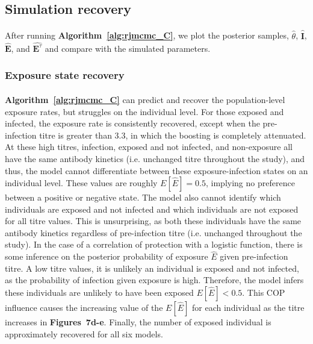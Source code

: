 \documentclass{article}
\begin{document}
\subsection{Simulation recovery }
\paragraph{}After running \textbf{Algorithm~\ref{alg:rjmcmc_C}}, we plot the posterior samples, $\hat{\theta}$, $\hat{\mathbf{I}}$,  $\hat{\mathbf{E}}$, and  $\hat{\mathbf{E}^\tau}$ and compare with the simulated parameters.

\subsubsection{Exposure state recovery}
\paragraph{} \textbf{Algorithm~\ref{alg:rjmcmc_C}} can predict and recover the population-level exposure rates, but struggles on the individual level. For those exposed and infected, the exposure rate is consistently recovered, except when the pre-infection titre is greater than 3.3, in which the boosting is completely attenuated. At these high titres, infection, exposed and not infected, and non-exposure all have the same antibody kinetics (i.e. unchanged titre throughout the study), and thus, the model cannot differentiate between these exposure-infection states on an individual level. These values are roughly $E[\hat{E}] = 0.5$, implying no preference between a positive or negative state. The model also cannot identify which individuals are exposed and not infected and which individuals are not exposed for all titre values. This is unsurprising, as both these individuals have the same antibody kinetics regardless of pre-infection titre (i.e. unchanged throughout the study). In the case of a correlation of protection with a logistic function, there is some inference on the posterior probability of exposure $\hat{E}$ given pre-infection titre. A low titre values, it is unlikely an individual is exposed and not infected, as the probability of infection given exposure is high. Therefore, the model infers these individuals are unlikely to have been exposed $E[\hat{E}] < 0.5$. This COP influence causes the increasing value of the $E[\hat{E}]$ for each individual as the titre increases in \textbf{Figures~7d-e}. Finally, the number of exposed individual is approximately recovered for all six models. 
\end{document}
